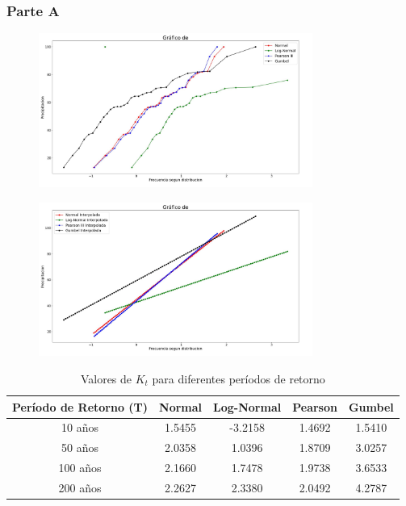 \documentclass{article}  %
\begin{document}
\subsubsection*{Parte A}

\begin{figure}[H]
  \centering
  \includegraphics[width=0.8\textwidth]{grafico.jpg}
  \caption{}
  \label{fig:grafico}
\end{figure}

\begin{figure}[H]
  \centering
  \includegraphics[width=0.8\textwidth]{grafico_interpolado.jpg}
  \caption{}
  \label{fig:grafico_interpolado}
\end{figure}

\begin{table}[H]
  \centering
  \caption{Valores de \( K_t \) para diferentes períodos de retorno}
  \begin{tabular}{|c|c|c|c|c|}
  \hline
  \textbf{Período de Retorno (T)} & \textbf{Normal} & \textbf{Log-Normal} & \textbf{Pearson} & \textbf{Gumbel} \\ \hline
  10 años  & 1.5455 & -3.2158 & 1.4692 & 1.5410 \\ \hline
  50 años  & 2.0358 & 1.0396 & 1.8709 & 3.0257 \\ \hline
  100 años & 2.1660 & 1.7478 & 1.9738 & 3.6533 \\ \hline
  200 años & 2.2627 & 2.3380 & 2.0492 & 4.2787 \\ \hline
  \end{tabular}
\end{table}
\end{document}
